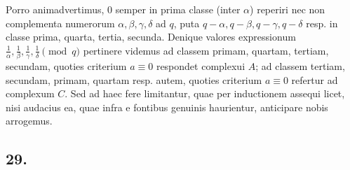 \documentclass[12pt]{article}
\begin{document}
Porro animadvertimus, $0$ semper in prima classe (inter $\alpha$) reperiri nec non complementa numerorum $\alpha,\beta,\gamma,\delta$ ad $q$, puta $q-\alpha,q-\beta,q-\gamma,q-\delta$ resp. in classe prima, quarta, tertia, secunda. Denique valores expressionum $\frac1{\alpha},\frac1{\beta},\frac1{\gamma},\frac1{\delta}\pmod q$ pertinere videmus ad classem primam, quartam, tertiam, secundam, quoties criterium $a\equiv0$ respondet complexui $A$; ad classem tertiam, secundam, primam, quartam resp. autem, quoties criterium $a\equiv0$ refertur ad complexum $C$. Sed ad haec fere limitantur, quae per inductionem assequi licet, nisi audacius ea, quae infra e fontibus genuinis haurientur, anticipare nobis arrogemus.

\subsection*{29.}
\end{document}
